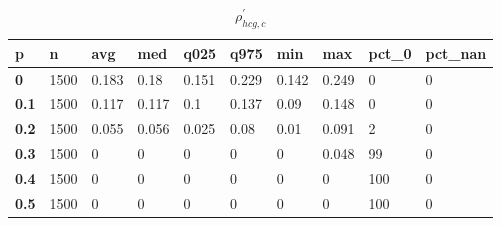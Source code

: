 \begin{table}[h]
 \centering 
\footnotesize
\caption{$\rho_{hcg,c}^\prime $}
\label{tab:alphahcgc}
\begin{tabular}[h]{|l|l|l|l|l|l|l|l|l|l|
    } \hline
\textbf{ p} & \textbf{ n} & \textbf{ avg} & \textbf{ med} & \textbf{ q025} & \textbf{ q975} & \textbf{ min} & \textbf{ max} & \textbf{ pct\_0} & \textbf{ pct\_nan}
    \\ \hline
  \textbf{  0} & 1500 & 0.183 &  0.18 & 0.151 & 0.229 & 0.142 & 0.249 &   0 & 0
    \\ \hline
  \textbf{0.1} & 1500 & 0.117 & 0.117 &   0.1 & 0.137 &  0.09 & 0.148 &   0 & 0
    \\ \hline
  \textbf{0.2} & 1500 & 0.055 & 0.056 & 0.025 &  0.08 &  0.01 & 0.091 &   2 & 0
    \\ \hline
  \textbf{0.3} & 1500 &     0 &     0 &     0 &     0 &     0 & 0.048 &  99 & 0
    \\ \hline
  \textbf{0.4} & 1500 &     0 &     0 &     0 &     0 &     0 &     0 & 100 & 0
    \\ \hline
  \textbf{0.5} & 1500 &     0 &     0 &     0 &     0 &     0 &     0 & 100 & 0
    \\ \hline
 \end{tabular}
 \end{table}
